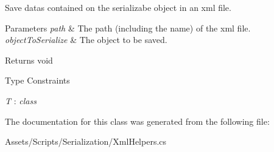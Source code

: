 Save datas contained on the serializabe object in an xml file.


\begin{DoxyParams}{Parameters}
{\em path} & The path (including the name) of the xml file.\\
\hline
{\em object\-To\-Serialize} & The object to be saved.\\
\hline
\end{DoxyParams}
\begin{DoxyReturn}{Returns}
void
\end{DoxyReturn}
\begin{Desc}
\item[Type Constraints]\begin{description}
\item[{\em T} : {\em class}]\end{description}
\end{Desc}


The documentation for this class was generated from the following file\-:\begin{DoxyCompactItemize}
\item 
Assets/\-Scripts/\-Serialization/Xml\-Helpers.\-cs\end{DoxyCompactItemize}
